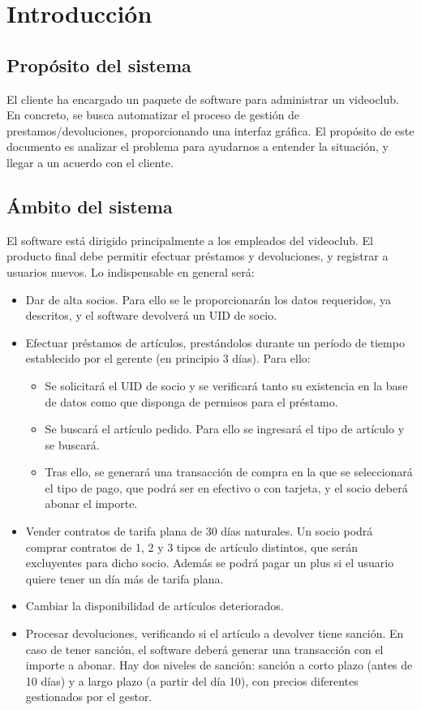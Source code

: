 \section{Introducción}
\subsection{Propósito del sistema}
El cliente ha encargado un paquete de software para administrar un videoclub.
En concreto, se busca automatizar el proceso de gestión de prestamos/devoluciones, proporcionando una interfaz gráfica.
El propósito de este documento es analizar el problema para ayudarnos a entender la situación, y llegar a un acuerdo con el cliente.

\subsection{Ámbito del sistema}
El software está dirigido principalmente a los empleados del videoclub.
El producto final debe permitir efectuar préstamos y devoluciones, y registrar a usuarios nuevos. Lo indispensable en general será:
\begin{itemize}
	\item Dar de alta socios. Para ello se le proporcionarán los datos requeridos, ya descritos, y el software devolverá un UID de socio.
	\item Efectuar préstamos de artículos, prestándolos durante un período de tiempo establecido por el gerente (en principio 3 días). Para ello:
	\begin{itemize}
		\item Se solicitará el UID de socio y se verificará tanto su existencia en la base de datos como que disponga de permisos para el préstamo. 
		\item Se buscará el artículo pedido. Para ello se ingresará el tipo de artículo y se buscará.
		\item Tras ello, se generará una transacción de compra en la que se seleccionará el tipo de pago, que podrá ser en efectivo o con tarjeta, y el socio deberá abonar el importe.
	\end{itemize}
	\item Vender contratos de tarifa plana de 30 días naturales. Un socio podrá comprar contratos de 1, 2 y 3 tipos de artículo distintos, que serán excluyentes para dicho socio. Además se podrá pagar un plus si el usuario quiere tener un día más de tarifa plana.
	\item Cambiar la disponibilidad de artículos deteriorados.
	\item Procesar devoluciones, verificando si el artículo a devolver tiene sanción. En caso de tener sanción, el software deberá generar una transacción con el importe a abonar. Hay dos niveles de sanción: sanción a corto plazo (antes de 10 días) y a largo plazo (a partir del día 10), con precios diferentes gestionados por el gestor.
\end{itemize}

